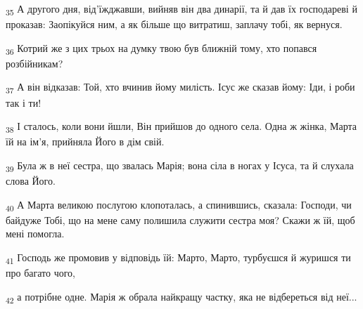 \begin{tcolorbox}
\textsubscript{35} А другого дня, від'їжджавши, вийняв він два динарії, та й дав їх господареві й проказав: Заопікуйся ним, а як більше що витратиш, заплачу тобі, як вернуся.
\end{tcolorbox}
\begin{tcolorbox}
\textsubscript{36} Котрий же з цих трьох на думку твою був ближній тому, хто попався розбійникам?
\end{tcolorbox}
\begin{tcolorbox}
\textsubscript{37} А він відказав: Той, хто вчинив йому милість. Ісус же сказав йому: Іди, і роби так і ти!
\end{tcolorbox}
\begin{tcolorbox}
\textsubscript{38} І сталось, коли вони йшли, Він прийшов до одного села. Одна ж жінка, Марта їй на ім'я, прийняла Його в дім свій.
\end{tcolorbox}
\begin{tcolorbox}
\textsubscript{39} Була ж в неї сестра, що звалась Марія; вона сіла в ногах у Ісуса, та й слухала слова Його.
\end{tcolorbox}
\begin{tcolorbox}
\textsubscript{40} А Марта великою послугою клопоталась, а спинившись, сказала: Господи, чи байдуже Тобі, що на мене саму полишила служити сестра моя? Скажи ж їй, щоб мені помогла.
\end{tcolorbox}
\begin{tcolorbox}
\textsubscript{41} Господь же промовив у відповідь їй: Марто, Марто, турбуєшся й журишся ти про багато чого,
\end{tcolorbox}
\begin{tcolorbox}
\textsubscript{42} а потрібне одне. Марія ж обрала найкращу частку, яка не відбереться від неї...
\end{tcolorbox}
